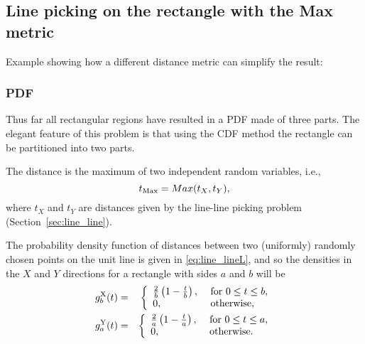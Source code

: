 \subsection{Line picking on the rectangle with the Max metric}
\label{sec:rect_manhattan}

Example showing how a different distance metric can simplify the result: 


\subsubsection{PDF}

Thus far all rectangular regions have resulted in a PDF made of three parts.
The elegant feature of this problem is that using the CDF method the rectangle 
can be partitioned into two parts. 

The  distance is the maximum of two independent random variables, i.e.,
\[ t_{\rm Max} = Max (t_X,  t_Y), \]
where $t_X$ and $t_Y$ are distances given by the line-line picking
problem (Section~\ref{sec:line_line}). 

The probability density function of distances between two (uniformly) 
randomly chosen points on the unit line is given in
\eqref{eq:line_lineL}, and so the densities in the $X$ and $Y$
directions for a rectangle with sides $a$ and $b$ will be 
\begin{eqnarray}
  \label{eq:rect_xy}
  g^{\rm X}_b(t) & = & \left\{ \begin{array}{ll}
                    \frac{2}{b} \left( 1-\frac{t}{b} \right), &
                         \mbox{ for } 0 \leq t \leq b, \\
                    0, & \mbox{ otherwise}, \\
                  \end{array} \right. \nonumber \\
  g^{\rm Y}_a(t) & = & \left\{ \begin{array}{ll}
                    \frac{2}{a} \left( 1-\frac{t}{a} \right), &
                         \mbox{ for } 0 \leq t \leq a, \\
                    0, & \mbox{ otherwise}. \\
                  \end{array} \right. \nonumber 
\end{eqnarray}

